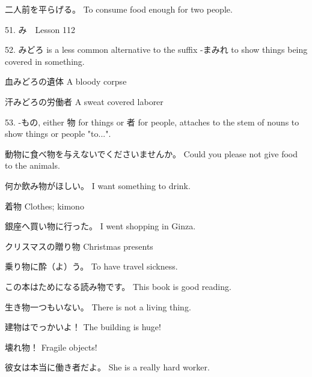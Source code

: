 \par{二人前を平らげる。 \hfill\break
To consume food enough for two people. }

\par{51. み　\textrightarrow  Lesson 112  }

\par{52. みどろ is a less common alternative to the suffix -まみれ to show things being covered in something. }

\par{血みどろの遺体 \hfill\break
A bloody corpse }

\par{汗みどろの労働者 \hfill\break
A sweat covered laborer }

\par{53. -もの, either 物 for things or 者 for people, attaches to the stem of nouns to show things or people "to\dothyp{}\dothyp{}\dothyp{}". }

\par{動物に食べ物を与えないでくださいませんか。 \hfill\break
Could you please not give food to the animals. }

\par{何か飲み物がほしい。 \hfill\break
I want something to drink. }

\par{着物 \hfill\break
Clothes; kimono }

\par{銀座へ買い物に行った。 \hfill\break
I went shopping in Ginza. }

\par{クリスマスの贈り物 \hfill\break
Christmas presents }

\par{乗り物に酔（よ）う。 \hfill\break
To have travel sickness. }

\par{この本はためになる読み物です。 \hfill\break
This book is good reading. }

\par{生き物一つもいない。 \hfill\break
There is not a living thing. }

\par{建物はでっかいよ！ \hfill\break
The building is huge! }

\par{壊れ物！ \hfill\break
Fragile objects! }

\par{彼女は本当に働き者だよ。 \hfill\break
She is a really hard worker. }

